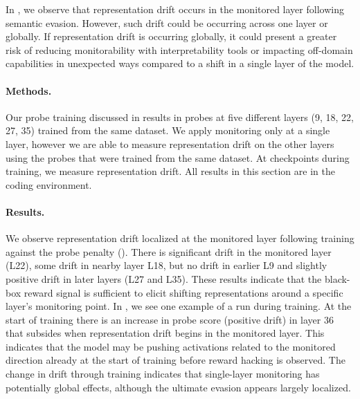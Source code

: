 \documentclass{article}
\begin{document}
In , we observe that representation drift occurs in the monitored layer following semantic evasion. However, such drift could be occurring across one layer or globally. If representation drift is occurring globally, it could present a greater risk of reducing monitorability with interpretability tools or impacting off-domain capabilities in unexpected ways compared to a shift in a single layer of the model.

\paragraph{Methods.} Our probe training discussed in  results in probes at five different layers (9, 18, 22, 27, 35) trained from the same dataset. We apply monitoring only at a single layer, however we are able to measure representation drift on the other layers using the probes that were trained from the same dataset. At checkpoints during training, we measure representation drift. All results in this section are in the coding environment. 

\paragraph{Results.} We observe representation drift localized at the monitored layer following training against the probe penalty (). There is significant drift in the monitored layer (L22), some drift in nearby layer L18, but no drift in earlier L9 and slightly positive drift in later layers (L27 and L35). These results indicate that the black-box reward signal is sufficient to elicit shifting representations around a specific layer's monitoring point. In , we see one example of a run during training. At the start of training there is an increase in probe score (positive drift) in layer 36 that subsides when representation drift begins in the monitored layer. This indicates that the model may be pushing activations related to the monitored direction already at the start of training before reward hacking is observed. The change in drift through training indicates that single-layer monitoring has potentially global effects, although the ultimate evasion appears largely localized.

\end{document}
